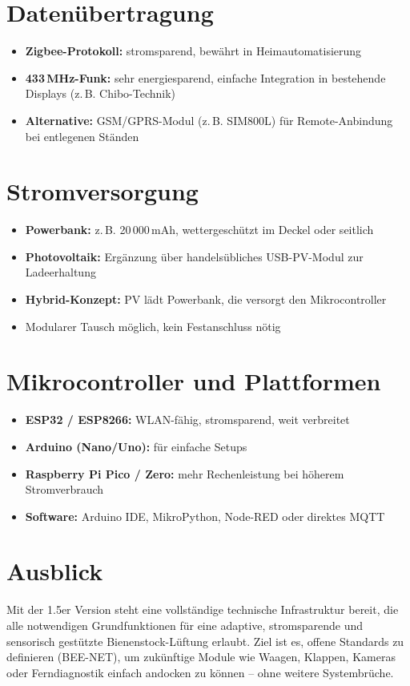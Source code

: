 \documentclass[11pt,a4paper]{article}
\begin{document}
\section*{Datenübertragung}

\begin{itemize}[leftmargin=1.5em]
  \item \textbf{Zigbee-Protokoll:} stromsparend, bewährt in Heimautomatisierung
  \item \textbf{433\,MHz-Funk:} sehr energiesparend, einfache Integration in bestehende Displays (z.\,B. Chibo-Technik)
  \item \textbf{Alternative:} GSM/GPRS-Modul (z.\,B. SIM800L) für Remote-Anbindung bei entlegenen Ständen
\end{itemize}

\section*{Stromversorgung}

\begin{itemize}[leftmargin=1.5em]
  \item \textbf{Powerbank:} z.\,B. 20\,000\,mAh, wettergeschützt im Deckel oder seitlich
  \item \textbf{Photovoltaik:} Ergänzung über handelsübliches USB-PV-Modul zur Ladeerhaltung
  \item \textbf{Hybrid-Konzept:} PV lädt Powerbank, die versorgt den Mikrocontroller
  \item Modularer Tausch möglich, kein Festanschluss nötig
\end{itemize}

\section*{Mikrocontroller und Plattformen}

\begin{itemize}[leftmargin=1.5em]
  \item \textbf{ESP32 / ESP8266:} WLAN-fähig, stromsparend, weit verbreitet
  \item \textbf{Arduino (Nano/Uno):} für einfache Setups
  \item \textbf{Raspberry Pi Pico / Zero:} mehr Rechenleistung bei höherem Stromverbrauch
  \item \textbf{Software:} Arduino IDE, MikroPython, Node-RED oder direktes MQTT
\end{itemize}

\section*{Ausblick}

Mit der 1.5er Version steht eine vollständige technische Infrastruktur bereit, die alle notwendigen Grundfunktionen für eine adaptive, stromsparende und sensorisch gestützte Bienenstock-Lüftung erlaubt. Ziel ist es, offene Standards zu definieren (BEE-NET), um zukünftige Module wie Waagen, Klappen, Kameras oder Ferndiagnostik einfach andocken zu können – ohne weitere Systembrüche.
\end{document}
